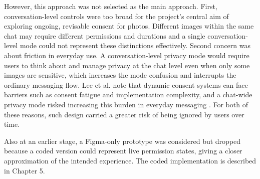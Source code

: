 However, this approach was not selected as the main approach. First, conversation-level controls were too broad for the project's central aim of exploring ongoing, revisable consent for photos. Different images within the same chat may require different permissions and durations and a single conversation-level mode could not represent these distinctions effectively. Second concern was about friction in everyday use. A conversation-level privacy mode would require users to think about and manage privacy at the chat level even when only some images are sensitive, which increases the mode confusion and interrupts the ordinary messaging flow. Lee et al. note that dynamic consent systems can face barriers such as consent fatigue and implementation complexity, and a chat-wide privacy mode risked increasing this burden in everyday messaging \cite{lee_identifying_2023}. For both of these reasons, such design carried a greater risk of being ignored by users over time.

Also at an earlier stage, a Figma-only prototype was considered but dropped because a coded version could represent live permission states, giving a closer approximation of the intended experience. The coded implementation is described in Chapter 5.